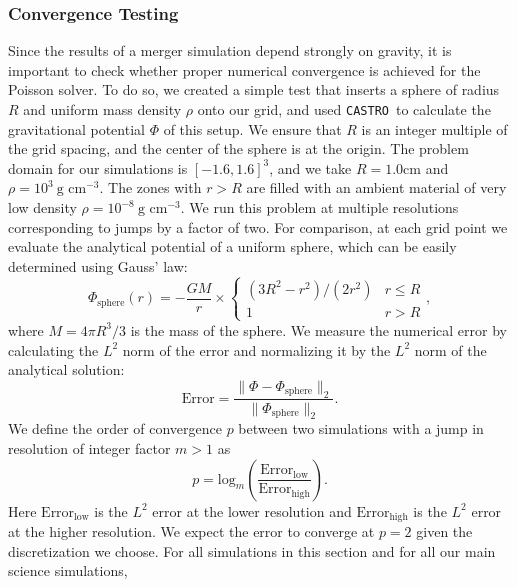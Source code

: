 \documentclass[iop]{../emulateapj}
\newcommand{\castro}{\texttt{CASTRO}}
\begin{document}
\subsubsection{Convergence Testing}\label{sec:gravity_convergence_testing}

Since the results of a merger simulation depend strongly on gravity,
it is important to check whether proper numerical convergence is
achieved for the Poisson solver. To do so, we created a simple test
that inserts a sphere of radius $R$ and uniform mass density $\rho$
onto our grid, and used \castro\ to calculate the gravitational
potential $\Phi$ of this setup. We ensure that $R$ is an integer
multiple of the grid spacing, and the center of the sphere is at the
origin. The problem domain for our simulations is $[-1.6, 1.6]^3$, and
we take $R = 1.0 \text{cm}$ and $\rho = 10^3\ \text{g cm}^{-3}$. 
The zones with $r > R$ are filled with an ambient material of very low density 
$\rho = 10^{-8}\ \text{g cm}^{-3}$. We run this problem at multiple 
resolutions corresponding to jumps by a factor of two. For
comparison, at each grid point we evaluate the analytical potential of
a uniform sphere, which can be easily determined using Gauss' law:
\begin{equation}
  \Phi_{\text{sphere}}(r) = -\frac{GM}{r} \times \begin{cases} (3R^2 - r^2)/(2 r^2) & r \leq R \\ 1 & r > R \end{cases},\label{eq:sphere-analytical}
\end{equation}
where $M = 4\pi R^3 / 3$ is the mass of the sphere. We measure the 
numerical error by calculating the $L^2$ norm of the error and 
normalizing it by the $L^2$ norm of the analytical solution:
\begin{equation}
  \text{Error} = \frac{\|\Phi - \Phi_{\text{sphere}}\|_2}{\|\Phi_{\text{sphere}}\|_2}.
\end{equation}
We define the order of convergence $p$ between two simulations with a jump 
in resolution of integer factor $m > 1$ as
\begin{equation}
  p = \text{log}_{m}\left(\frac{\text{Error}_{\text{low}}}{\text{Error}_{\text{high}}}\right).
\end{equation}
Here $\text{Error}_{\text{low}}$ is the $L^2$ error at the lower resolution 
and $\text{Error}_{\text{high}}$ is the $L^2$ error at the higher resolution.
We expect the error to converge at $p = 2$ given the discretization we choose. 
For all simulations in this section and for all our main science simulations,
\end{document}
